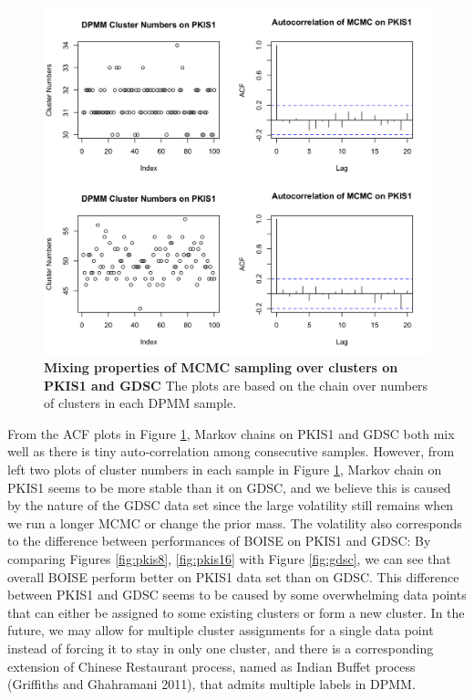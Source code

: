 \documentclass[12pt]{article}
\begin{document}
\begin{figure}[!ht]
\caption{\label{fig:mcmc} 
{\bf Mixing properties of MCMC sampling over clusters on PKIS1 and GDSC} The plots are based on the chain over numbers of clusters in each DPMM sample.}
\centering
\includegraphics[width=5.0in]{DPMM_performance.png}
\end{figure}

From the ACF plots in Figure \ref{fig:mcmc}, Markov chains on PKIS1 and GDSC both mix well as there is tiny auto-correlation among consecutive samples. However, from left two plots of cluster numbers in each sample in Figure \ref{fig:mcmc}, Markov chain on PKIS1 seems to be more stable than it on GDSC, and we believe this is caused by the nature of the GDSC data set since the large volatility still remains when we run a longer MCMC or change the prior mass. The volatility also corresponds to the difference between performances of BOISE on PKIS1 and GDSC: By comparing Figures  \ref{fig:pkis8}, \ref{fig:pkis16} with Figure \ref{fig:gdsc}, we can see that overall BOISE perform better on PKIS1 data set than on GDSC. This difference between PKIS1 and GDSC seems to be caused by some overwhelming data points that can either be assigned to some existing clusters or form a new cluster. In the future, we may allow for multiple cluster assignments for a single data point instead of forcing it to stay in only one cluster, and there is a corresponding extension of Chinese Restaurant process, named as Indian Buffet process (Griffiths and Ghahramani 2011), that admits multiple labels in DPMM. 
\end{document}
